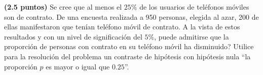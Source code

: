 
\textbf{(2.5 puntos)} Se cree que al menos el $25\%$ de los usuarios de teléfonos móviles son de contrato. De una encuesta realizada a 950 personas, elegida al azar, 200 de ellas manifestaron que tenían teléfono móvil de contrato. A la vista de estos resultados y con un nivel de significación del $5\%$, \textquestiondown{}puede admitirse que la proporción de personas con contrato en su teléfono móvil ha disminuido? Utilice para la resolución del problema un contraste de hipótesis con hipótesis nula ``la proporción $p$ es mayor o igual que $0.25$''.

